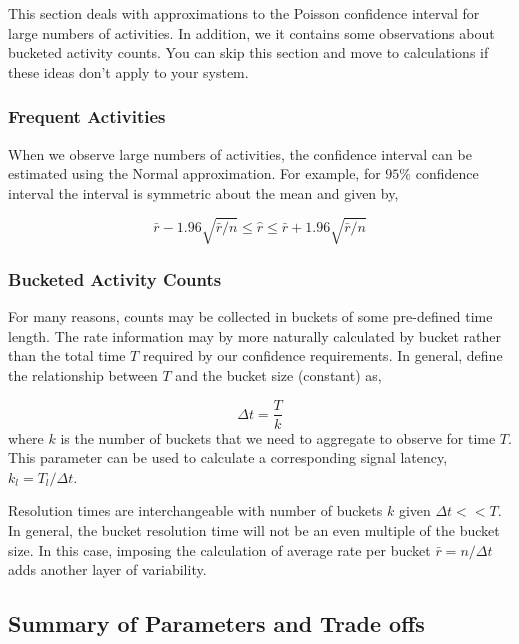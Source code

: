 \documentclass{article}
\begin{document}
This section deals with approximations to the Poisson confidence interval for large numbers of activities. In
addition, we it contains some observations about bucketed activity counts. You can skip this section and
move to calculations if these ideas don't apply to your system.

\subsubsection{Frequent Activities} 

When we observe large numbers of activities, the confidence interval can be estimated using the Normal
approximation. For example, for $95\%$ confidence interval the interval is symmetric about the mean
and given by,

\begin{equation}
    \label{eq:largenconf}
    \bar{r} - 1.96 \sqrt{\bar{r}/n} \leq \hat{r} \leq \bar{r} + 1.96 \sqrt{\bar{r}/n}
\end{equation}

\subsubsection{Bucketed Activity Counts}

For many reasons, counts may be collected in buckets of some pre-defined time length.  The rate information
may by more naturally calculated by bucket rather than the total time $T$ required by our confidence
requirements. In general, define the relationship between $T$ and the bucket size (constant) as,

\begin{equation}
    \label{eq:bucket}
    \Delta t = \frac{T}{k}
\end{equation}
where $k$ is the number of buckets that we need to aggregate to observe for time $T$. This parameter
can be used to calculate a corresponding signal latency, $k_l = T_l/\Delta t$.

Resolution times are interchangeable with number of buckets $k$ given $\Delta t << T$.  In general, the
bucket resolution time will not be an even multiple of the bucket size.  In this case, imposing the calculation
of average rate per bucket $\bar{r} = n/\Delta t$ adds another layer of variability.

\subsection{Summary of Parameters and Trade offs}
\end{document}
